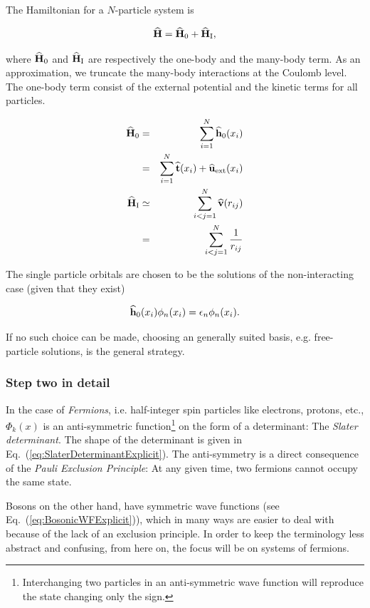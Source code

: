 The Hamiltonian for a $N$-particle system is 

\begin{equation}
 {\bf\widehat{H}} = {\bf\widehat{H}}_0 + {\bf\widehat{H}}_\mathrm{I},
\end{equation}

where ${\bf\widehat{H}}_0$ and ${\bf\widehat{H}}_\mathrm{I}$ are respectively the one-body and the many-body term. As an approximation, we truncate the many-body interactions at the Coulomb level. The one-body term consist of the external potential and the kinetic terms for all particles.

\begin{eqnarray}
 {\bf\widehat{H}}_0 &=& \sum_{i=1}^N {\bf\widehat{h}}_0(x_i) \\
          &=& \sum_{i=1}^N {\bf\widehat{t}}(x_i) + {\bf\widehat{u}}_\mathrm{ext}(x_i) \nonumber\\
 {\bf\widehat{H}}_\mathrm{I} &\simeq& \sum_{i<j=1}^N {\bf\widehat{v}}(r_{ij}) \\
          &=& \sum_{i<j=1}^N \frac{1}{r_{ij}}  \nonumber
\end{eqnarray}

The single particle orbitals are chosen to be the solutions of the non-interacting case (given that they exist)

\begin{equation}
\label{eq:orbitalEigenEq}
 {\bf\widehat{h}}_0(x_i)\phi_n(x_i) = \epsilon_n\phi_n(x_i).
\end{equation}

If no such choice can be made, choosing an generally suited basis, e.g. free-particle solutions, is the general strategy. 


\subsubsection{Step two in detail}

In the case of \textit{Fermions}, i.e. half-integer spin particles like electrons, protons, etc., $\Phi_k(x)$ is an anti-symmetric function\footnote{Interchanging two particles in an anti-symmetric wave function will reproduce the state changing only the sign.} on the form of a determinant: The \textit{Slater determinant}. The shape of the determinant is given in Eq.~(\ref{eq:SlaterDeterminantExplicit}). The anti-symmetry is a direct consequence of the \textit{Pauli Exclusion Principle}: At any given time, two fermions cannot occupy the same state. 

Bosons on the other hand, have symmetric wave functions (see Eq.~(\ref{eq:BosonicWFExplicit})), which in many ways are easier to deal with because of the lack of an exclusion principle. In order to keep the terminology less abstract and confusing, from here on, the focus will be on systems of fermions.


